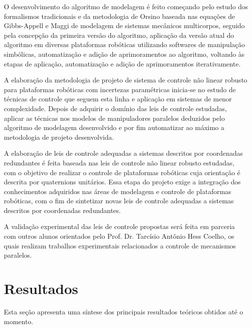 \documentclass[a4paper,11pt,brazil,fleqn]{article}
\begin{document}
O desenvolvimento do algoritmo de modelagem \'e feito come\c{c}ando pelo estudo dos formalismos tradicionais e da metodologia de Orsino baseada nas equa\c{c}\~oes de Gibbs-Appell e Maggi de modelagem de sistemas mec\^anicos multicorpos, seguido pela concep\c{c}\~ao da primeira vers\~ao do algoritmo, aplica\c{c}\~ao da vers\~ao atual do algoritmo em diversas plataformas rob\'oticas utilizando softwares de manipula\c{c}\~ao simb\'olicas, automatiza\c{c}\~ao e adi\c{c}\~ao de aprimoramentos ao algoritmo, voltando \`as etapas de aplica\c{c}\~ao, automatiza\c{c}\~ao e adi\c{c}\~ao de aprimoramentos iterativamente.

A elabora\c{c}\~ao da metodologia de projeto de sistema de controle n\~ao linear robusto para plataformas rob\'oticas com incertezas param\'etricas inicia-se no estudo de t\'ecnicas de controle que seguem esta linha e aplica\c{c}\~ao em sistemas de menor complexidade. Depois de adquirir o dom\'inio das leis de controle estudadas, aplicar as t\'ecnicas nos modelos de manipuladores paralelos deduzidos pelo algoritmo de modelagem desenvolvido e por fim automatizar ao m\'aximo a metodologia de projeto desenvolvida.

A elabora\c{c}\~ao de leis de controle adequadas a sistemas descritos por coordenadas redundantes \'e feita baseada nas leis de controle n\~ao linear robusto estudadas, com o objetivo de realizar o controle de plataformas rob\'oticas cuja orienta\c{c}\~ao \'e descrita por quaternions unit\'arios. Essa etapa do projeto exige a integra\c{c}\~ao dos conhecimentos adquiridos nas \'areas de modelagem e controle de plataformas rob\'oticas, com o fim de sintetizar novas leis de controle adequadas a sistemas descritos por coordenadas redundantes.

A valida\c{c}\~ao experimental das leis de controle propostas ser\'a feita em parceria com outros alunos orientados pelo Prof. Dr. Tarc\'isio Ant\^onio Hess Coelho, os quais realizam trabalhos experimentais relacionados a controle de mecanismos paralelos. 


\section{Resultados}\label{S04}

Esta se\c{c}\~ao apresenta uma s\'intese dos principais resultados te\'oricos obtidos at\'e o momento.

\end{document}
